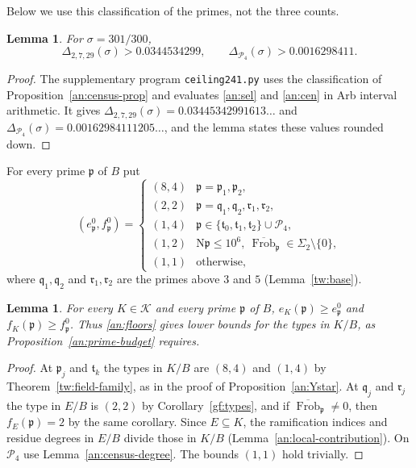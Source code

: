 \documentclass[11pt]{amsart}
\numberwithin{equation}{section}
\newtheorem{lemma}[equation]{Lemma}
\theoremstyle{definition}
\theoremstyle{remark}
\DeclareMathOperator{\Frob}{Frob}
\begin{document}
Below we use this classification of the primes, not the three counts.

\begin{lemma}\label{an:corrections}
For $\sigma=301/300$,
\begin{equation}\label{an:census-values}
 \Delta_{2,7,29}(\sigma)>0.0344534299,\qquad
 \Delta_{\mathcal P_4}(\sigma)>0.0016298411.
\end{equation}
\end{lemma}

\begin{proof}
The supplementary program \texttt{ceiling241.py} uses the classification of
Proposition~\ref{an:census-prop} and evaluates \eqref{an:sel} and
\eqref{an:cen} in Arb interval arithmetic. It gives
$\Delta_{2,7,29}(\sigma)=0.03445342991613\ldots$ and
$\Delta_{\mathcal P_4}(\sigma)=0.00162984111205\ldots$, and the lemma states
these values rounded down.
\end{proof}

For every prime $\mathfrak p$ of $B$ put
\begin{equation}\label{an:floors}
 (e^0_{\mathfrak p},f^0_{\mathfrak p})=
 \begin{cases}
 (8,4)&\mathfrak p=\mathfrak p_1,\mathfrak p_2,\\
 (2,2)&\mathfrak p=\mathfrak q_1,\mathfrak q_2,\mathfrak r_1,\mathfrak r_2,\\
 (1,4)&\mathfrak p\in\{\mathfrak t_0,\mathfrak t_1,\mathfrak t_2\}\cup\mathcal P_4,\\
 (1,2)&\mathrm N\mathfrak p\le10^6,\ \overline{\Frob}_{\mathfrak p}\in\Sigma_2\setminus\{0\},\\
 (1,1)&\text{otherwise},
 \end{cases}
\end{equation}
where $\mathfrak q_1,\mathfrak q_2$ and $\mathfrak r_1,\mathfrak r_2$ are the
primes above $3$ and $5$ (Lemma~\ref{tw:base}).

\begin{lemma}\label{an:floors-valid}
For every $K\in\mathcal K$ and every prime $\mathfrak p$ of $B$,
$e_K(\mathfrak p)\ge e^0_{\mathfrak p}$ and
$f_K(\mathfrak p)\ge f^0_{\mathfrak p}$. Thus \eqref{an:floors} gives lower
bounds for the types in $K/B$, as Proposition~\ref{an:prime-budget}
requires.
\end{lemma}

\begin{proof}
At $\mathfrak p_j$ and $\mathfrak t_k$ the types in $K/B$ are $(8,4)$ and
$(1,4)$ by Theorem~\ref{tw:field-family}, as in the proof of
Proposition~\ref{an:Ystar}. At $\mathfrak q_j$ and $\mathfrak r_j$ the type
in $E/B$ is $(2,2)$ by Corollary~\ref{gf:types}, and if
$\overline{\Frob}_{\mathfrak p}\ne0$, then $f_E(\mathfrak p)=2$ by the same corollary.
Since $E\subseteq K$, the ramification indices and residue degrees in $E/B$
divide those in $K/B$ (Lemma~\ref{an:local-contribution}). On
$\mathcal P_4$ use Lemma~\ref{an:census-degree}. The bounds $(1,1)$ hold
trivially.
\end{proof}
\end{document}

